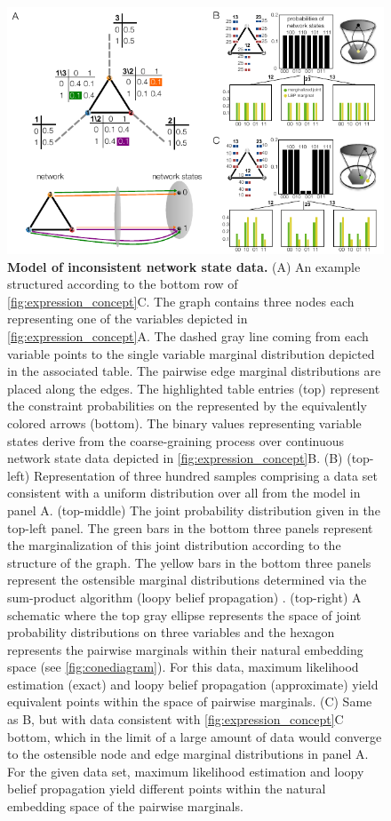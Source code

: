 \begin{figure}[!ht]
\centering
\noindent\includegraphics[width=0.9\columnwidth]{fig/inconsistentthreecycle.pdf}
\caption{{\bf Model of inconsistent network state data.} (A) An example structured according to the bottom row of \autoref{fig:expression_concept}C. The graph contains three nodes each representing one of the variables depicted in \autoref{fig:expression_concept}A. The dashed gray line coming from each variable points to the single variable marginal distribution depicted in the associated table. The pairwise edge marginal distributions are placed along the edges. The highlighted table entries (top) represent the constraint probabilities on the \gnpm{} represented by the equivalently colored arrows (bottom). The binary values representing variable states derive from the coarse-graining process over continuous network state data depicted in \autoref{fig:expression_concept}B. (B) (top-left) Representation of three hundred samples comprising a data set consistent with a uniform distribution over all \gnpm{} from the model in panel A. (top-middle) The joint probability distribution  given in the top-left panel. The green bars in the bottom three panels represent the marginalization of this joint distribution according to the structure of the graph. The yellow bars in the bottom three panels represent the ostensible marginal distributions determined via the sum-product algorithm (loopy belief propagation) \cite{Barber2012}. (top-right) A schematic where the top gray ellipse represents the space of joint probability distributions on three variables and the hexagon represents the pairwise marginals within their natural embedding space (see \autoref{fig:conediagram}).  For this data, maximum likelihood estimation (exact) and loopy belief propagation (approximate) yield equivalent points within the space of pairwise marginals. (C) Same as B, but with data consistent with \autoref{fig:expression_concept}C bottom, which in the limit of a large amount of data would converge to the ostensible node and edge marginal distributions in panel A. For the given data set, maximum likelihood estimation and loopy belief propagation yield different points within the natural embedding space of the pairwise marginals.}
\label{fig:inconsistentthreecycle}
\end{figure}



